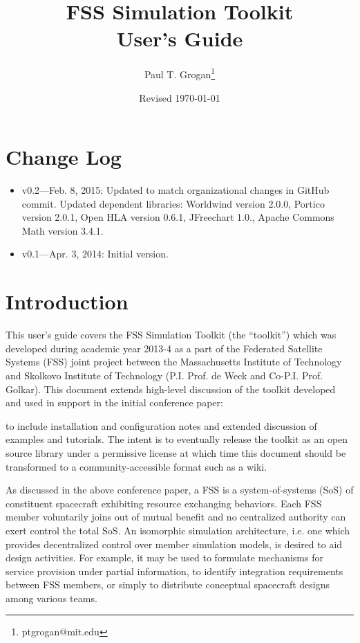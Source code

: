 \documentclass[]{article}
\title{FSS Simulation Toolkit \\ User's Guide}
\author{Paul T. Grogan\footnote{ptgrogan@mit.edu}}
\date{Revised \today}
\begin{document}
\maketitle
\section*{Change Log}
\begin{itemize}
\item v0.2---Feb. 8, 2015: Updated to match organizational changes in GitHub commit. Updated dependent libraries: Worldwind version 2.0.0, Portico version 2.0.1, Open HLA version 0.6.1, JFreechart 1.0., Apache Commons Math version 3.4.1.
\item v0.1---Apr. 3, 2014: Initial version.
\end{itemize}


\section{Introduction}

This user's guide covers the FSS Simulation Toolkit (the ``toolkit'') which was developed during academic year 2013-4 as a part of the Federated Satellite Systems (FSS) joint project between the Massachusetts Institute of Technology and Skolkovo Institute of Technology (P.I. Prof. de Weck and Co-P.I. Prof. Golkar). This document extends high-level discussion of the toolkit developed and used in support in the initial conference paper:
\begin{quote}
\small
{}
\end{quote}
to include installation and configuration notes and extended discussion of examples and tutorials. The intent is to eventually release the toolkit as an open source library under a permissive license at which time this document should be transformed to a community-accessible format such as a wiki.

As discussed in the above conference paper, a FSS is a system-of-systems (SoS) of constituent spacecraft exhibiting resource exchanging behaviors. Each FSS member voluntarily joins out of mutual benefit and no centralized authority can exert control the total SoS. An isomorphic simulation architecture, i.e. one which provides decentralized control over member simulation models, is desired to aid design activities. For example, it may be used to formulate mechanisms for service provision under partial information, to identify integration requirements between FSS members, or simply to distribute conceptual spacecraft designs among various teams.
\end{document}

